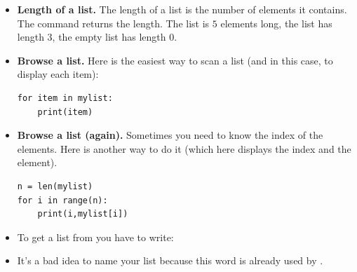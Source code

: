 \documentclass[11pt,class=report,crop=false]{standalone}
\begin{document}
\begin{cours}[List (2)]
\sauteligne
\begin{itemize}
  \item \textbf{Length of a list.} The length of a list is the number of elements it contains. The command  returns the length. The list \ci{[5,4,3,2,1]} is $5$ elements long, the list  has length $3$, the empty list \ci{[]} has length $0$.
  
  \item \textbf{Browse a list.} 
	Here is the easiest way to scan a list (and in this case, to display each item):
\begin{lstlisting}
for item in mylist:
    print(item)
\end{lstlisting}

  \item \textbf{Browse a list (again).} 
  Sometimes you need to know the index of the elements. Here is another way to do it (which here displays the index and the element).
\begin{lstlisting}
n = len(mylist)
for i in range(n):
    print(i,mylist[i])
\end{lstlisting}  

\item To get a list from  you have to write:

\item It's a bad idea to name your list \og{}\fg{} because this word is already used by \Python{}.
\end{itemize}
\end{cours}



\end{document}
